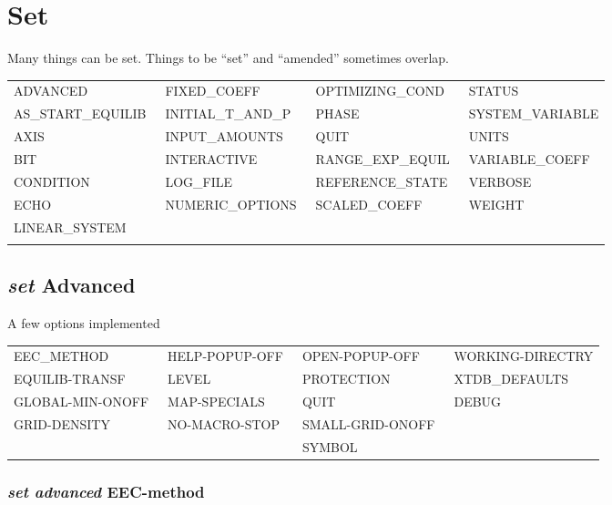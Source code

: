 \documentclass[11pt]{article}
\begin{document}
\hypertarget{Set}{}
\section{Set }

Many things can be set.  Things to be ``set'' and ``amended''
sometimes overlap.

{\small
\begin{tabular}{llll}
 ADVANCED          & FIXED\_COEFF     & OPTIMIZING\_COND~ & STATUS\\
 AS\_START\_EQUILIB~&INITIAL\_T\_AND\_P~ & PHASE         & SYSTEM\_VARIABLE\\
 AXIS              & INPUT\_AMOUNTS   & QUIT             & UNITS\\ 
 BIT               & INTERACTIVE      & RANGE\_EXP\_EQUIL~ & VARIABLE\_COEFF\\
 CONDITION         & LOG\_FILE        & REFERENCE\_STATE & VERBOSE\\
 ECHO              & NUMERIC\_OPTIONS~ & SCALED\_COEFF    & WEIGHT\\
 LINEAR\_SYSTEM    &                  &                  & \\\\
\end{tabular}
}

\hypertarget{Advanced command}{}
\subsection{{\em set} Advanced}

A few options implemented

{\small
\begin{tabular}{llll}
 EEC\_METHOD      & HELP-POPUP-OFF~& OPEN-POPUP-OFF~ & WORKING-DIRECTRY\\ 
 EQUILIB-TRANSF~  & LEVEL          & PROTECTION     & XTDB\_DEFAULTS\\
 GLOBAL-MIN-ONOFF~& MAP-SPECIALS   & QUIT           & DEBUG\\
 GRID-DENSITY     & NO-MACRO-STOP  & SMALL-GRID-ONOFF~ \\
                  &                & SYMBOL \\
\end{tabular}
}

\hypertarget{Set adv EEC-method}{}
\hypertarget{Set adv EEC}{}
\subsubsection{{\em set advanced} EEC-method}\label{sc:eec-method}
\end{document}
